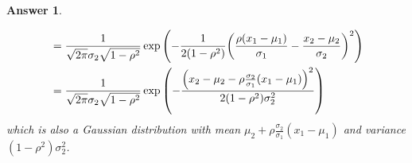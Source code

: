 \documentclass[utf8]{article}
\theoremstyle{definition}%
\theoremstyle{plain}%
\newtheorem{answer}{Answer} %
\begin{document}
\begin{answer}
\begin{enumerate}[label=(\alph*)]
\begin{equation}
\begin{aligned}
            &= \frac{1}{\sqrt{2\pi} \sigma_2\sqrt{1 - \rho^2}} \exp\qty(-\frac{1}{2(1 - \rho^2)} \qty(\frac{\rho (x_1 - \mu_1)}{\sigma_1} - \frac{x_2 - \mu_2}{\sigma_2})^2) \\ 
            &= \frac{1}{\sqrt{2\pi} \sigma_2\sqrt{1 - \rho^2}} \exp\qty(-\frac{\qty(x_2 - \mu_2 - \rho \frac{\sigma_2}{\sigma_1} (x_1 - \mu_1))^2}{2(1 - \rho^2)\sigma_2^2}) 
        \end{aligned}
        \end{equation}
        which is also a Gaussian distribution with mean $\mu_2 + \rho \frac{\sigma_2}{\sigma_1} (x_1 - \mu_1)$ and variance $(1 - \rho^2)\sigma_2^2$.
    \end{enumerate}
\end{answer}
\end{document}

